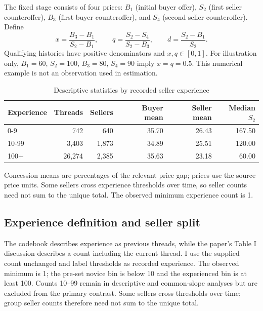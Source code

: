 \documentclass[11pt,a4paper]{article}
\begin{document}
The fixed stage consists of four prices: $B_1$ (initial buyer offer),
$S_2$ (first seller counteroffer), $B_3$ (first buyer counteroffer), and
$S_4$ (second seller counteroffer). Define
\begin{equation}
x=\frac{B_3-B_1}{S_2-B_1},\qquad
q=\frac{S_2-S_4}{S_2-B_3},\qquad
d=\frac{S_2-B_1}{S_2}.\label{eq:measures}
\end{equation}
Qualifying histories have positive denominators and $x,q\in[0,1]$.
For illustration only, $B_1=60$, $S_2=100$, $B_3=80$, $S_4=90$ imply
$x=q=0.5$. This numerical example is not an observation used in estimation.
\begin{table}[htbp]
\centering\small
\caption{Descriptive statistics by recorded seller experience}\label{tab:desc}
\begin{tabular}{lrrrrr}
\toprule
Experience & Threads & Sellers & Buyer mean & Seller mean & Median $S_2$ \\
\midrule
0-9 & 742 & 640 & 35.70 & 26.43 & 167.50 \\
10-99 & 3,403 & 1,873 & 34.89 & 25.51 & 120.00 \\
100+ & 26,274 & 2,385 & 35.63 & 23.18 & 60.00 \\
\bottomrule
\end{tabular}
\par\vspace{4pt}\begin{minipage}{\linewidth}\footnotesize Concession means are percentages of the relevant price gap; prices use the source price units. Some sellers cross experience thresholds over time, so seller counts need not sum to the unique total. The observed minimum experience count is 1.\end{minipage}
\end{table}

\subsection{Experience definition and seller split}
The codebook describes experience as previous threads, while the paper's
Table I discussion describes a count including the current thread. I use
the supplied count unchanged and label thresholds as recorded experience.
The observed minimum is 1; the pre-set novice bin is below 10 and the
experienced bin is at least 100. Counts 10--99 remain in descriptive and
common-slope analyses but are excluded from the primary contrast.
Some sellers cross thresholds over time; group seller counts therefore need
not sum to the unique total.
\end{document}
